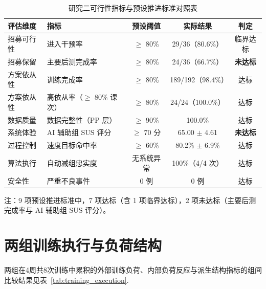 \begin{table}[htbp]
\centering
\caption{研究二可行性指标与预设推进标准对照表}
\label{tab:progression_criteria}
\begin{threeparttable}
\begin{tabular}{@{}llccc@{}}
\toprule
\textbf{评估维度} & \textbf{指标} & \textbf{预设阈值} & \textbf{实际结果} & \textbf{判定} \\
\midrule
招募可行性 & 进入干预率           & $\ge$ 80\%   & 29/36（80.6\%）    & 临界达标 \\
招募保留   & 主要后测完成率       & $\ge$ 80\%   & 24/36（66.7\%）    & \textbf{未达标} \\
方案依从性 & 训练完成率           & $\ge$ 80\%   & 189/192（98.4\%）  & 达标 \\
方案依从性 & 高依从率（$\ge$ 80\% 课次） & $\ge$ 80\% & 24/24（100.0\%）   & 达标 \\
数据质量   & 数据完整性（PP 层）  & $\ge$ 90\%   & 100.0\%            & 达标 \\
系统体验   & AI 辅助组 SUS 评分   & $\ge$ 70 分  & 65.00 $\pm$ 4.61    & \textbf{未达标} \\
过程控制   & 速度目标命中率       & $\ge$ 60\%   & 80.2\% $\pm$ 6.9\%  & 达标 \\
算法执行   & 自动减组忠实度       & 无系统异常   & 100\%（4/4 次）    & 达标 \\
安全性     & 严重不良事件         & 0 例         & 0 例               & 达标 \\
\bottomrule
\end{tabular}
\begin{tablenotes}[flushleft]\footnotesize
\item 注：9 项预设推进标准中，7 项达标（含 1 项临界达标），2 项未达标（主要后测完成率与 AI 辅助组 SUS 评分）。
\end{tablenotes}
\end{threeparttable}
\end{table}

\section{两组训练执行与负荷结构}
\label{sec:training_execution_results}

两组在4周共8次训练中累积的外部训练负荷、内部负荷反应与派生结构指标的组间比较结果见表~\ref{tab:training_execution}.

